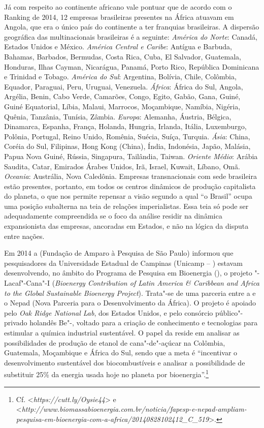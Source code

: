 Já com respeito ao continente africano vale pontuar que de acordo com o
Ranking  de 2014, 12 empresas brasileiras presentes na África atuavam
em Angola, que era o único país do continente a ter franquias
brasileiras. A dispersão geográfica das multinacionais brasileiras é a
seguinte: \emph{América do Norte}: Canadá, Estados Unidos e México.
\emph{América Central e Caribe}: Antígua e Barbuda, Bahamas, Barbados,
Bermudas, Costa Rica, Cuba, El Salvador, Guatemala, Honduras, Ilhas
Cayman, Nicarágua, Panamá, Porto Rico, República Dominicana e Trinidad e
Tobago. \emph{América do Sul}: Argentina, Bolívia, Chile, Colômbia,
Equador, Paraguai, Peru, Uruguai, Venezuela. \emph{África}: África do
Sul, Angola, Argélia, Benin, Cabo Verde, Camarões, Congo, Egito, Gabão,
Gana, Guiné, Guiné Equatorial, Líbia, Malaui, Marrocos, Moçambique,
Namíbia, Nigéria, Quênia, Tanzânia, Tunísia, Zâmbia. \emph{Europa}:
Alemanha, Áustria, Bélgica, Dinamarca, Espanha, França, Holanda,
Hungria, Irlanda, Itália, Luxemburgo, Polônia, Portugal, Reino Unido,
Romênia, Suécia, Suíça, Turquia. \emph{Ásia}: China, Coréia do Sul,
Filipinas, Hong Kong (China), Índia, Indonésia, Japão, Malásia, Papua
Nova Guiné, Rússia, Singapura, Tailândia, Taiwan. \emph{Oriente
Médio}: Arábia Saudita, Catar, Emirados Árabes Unidos, Irã, Israel,
Kuwait, Líbano, Omã. \emph{Oceania}: Austrália, Nova Caledônia.
Empresas transnacionais com sede brasileira estão presentes, portanto,
em todos os centros dinâmicos de produção capitalista do planeta, o que
nos permite repensar a visão segundo a qual ``o Brasil'' ocupa uma
posição subalterna na teia de relações imperialistas. Essa teia só pode
ser adequadamente compreendida se o foco da análise residir na dinâmica
expansionista das empresas, ancoradas em Estados, e não na lógica da
disputa entre nações.

Em 2014 a  (Fundação de Amparo à Pesquisa de São Paulo) informou
que pesquisadores da Universidade Estadual de Campinas (Unicamp -- )
estavam desenvolvendo, no âmbito do Programa  de Pesquisa em
Bioenergia (), o projeto "-Lacaf"-Cana"-I (\emph{Bioenergy
Contribution of Latin America \& Caribbean and Africa to the Global
Sustainable Bioenergy Project}). Trata"-se de uma parceria entre a 
e o Nepad (Nova Parceria para o Desenvolvimento da África). O projeto
 é apoiado pelo \emph{Oak Ridge National Lab}, dos Estados Unidos, e
pelo consórcio público"-privado holandês Be"-, voltado para a criação
de conhecimento e tecnologias para estimular a química industrial
sustentável. O papel da  reside em analisar as possibilidades de
produção de etanol de cana"-de"-açúcar na Colômbia, Guatemala, Moçambique
e África do Sul, sendo que a meta é ``incentivar o desenvolvimento
sustentável dos biocombustíveis e analisar a possibilidade de substituir
25\% da energia usada hoje no planeta por bioenergia''.\footnote{Cf.
  \textless{}\emph{https://cutt.ly/Oysie44}\textgreater{}
  e
  \textless{}\emph{http://www.biomassabioenergia.com.br/noticia/fapesp-e-nepad-ampliam-pesquisa-em-bioenergia-com-a-africa/20140828102412\_C\_519}\textgreater{}.}

